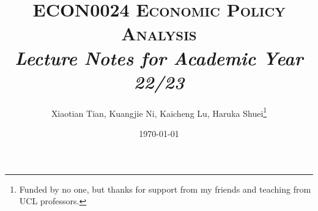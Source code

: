 \documentclass{report}
\title{\textsc{ECON0024 Economic Policy Analysis}\\
{\Large \textit{Lecture Notes for Academic Year 22/23}}}
\author{Xiaotian Tian, Kuangjie Ni, Kaicheng Lu, Haruka Shuei\thanks{Funded by no one, but thanks for support from my friends and teaching from UCL professors.}}
\date{\today}
\begin{document}
\begin{CJK*}{UTF8}{gbsn}%

\pagestyle{fancy}%

\maketitle

\newpage
    \hypertarget{tableofcontents}{\tableofcontents}
\newpage


%


\iftrue %
    
    
\fi

\iftrue
   
   
\fi

\iftrue
    \begin{refsection} %
        
        \printbibliography %
    \end{refsection}
    \begin{refsection}
        
        \printbibliography %
    \end{refsection}
\fi

\iftrue
    
    
\fi

\iftrue
    \begin{refsection} %
        
        \printbibliography %
    \end{refsection}
    \begin{refsection}
        
        \printbibliography %
    \end{refsection}
\fi

\iftrue
    \begin{refsection} %
        
        \printbibliography %
    \end{refsection}
    \begin{refsection}
        
        \printbibliography %
    \end{refsection}
\fi


\end{CJK*}
\end{document}
